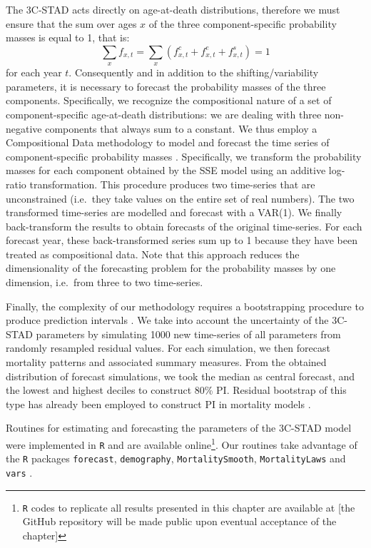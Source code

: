 \documentclass[11pt, a4paper]{article}
\begin{document}
The 3C-STAD acts directly on age-at-death distributions, therefore we must ensure that the sum over ages $x$ of the three component-specific probability masses is equal to 1, that is:
%
\begin{equation}\label{Eq:Masses}
\sum_{x} f_{x,t} = \sum_{x} \left( f^{c}_{x,t}+f^{e}_{x,t}+f^{s}_{x,t}  \right) = 1
\end{equation}
% 
for each year $t$. Consequently and in addition to the shifting/{\color{red}variability} parameters, it is necessary to forecast the probability masses of the three components. Specifically, we recognize the compositional nature of a set of component-specific age-at-death distributions: we are dealing with three non-negative components that always sum to a constant. We thus employ a Compositional Data methodology to model and forecast the time series of component-specific probability masses \citep{aitchison1986statistical, CoDa2011}. Specifically, we transform the probability masses for each component obtained by the SSE model using an additive log-ratio transformation. This procedure produces two time-series that are unconstrained (i.e.~they take values on the entire set of real numbers). The two transformed time-series are modelled and forecast with a VAR(1). We finally back-transform the results to obtain forecasts of the original time-series. For each forecast year, these back-transformed series sum up to 1 because they have been treated as compositional data. Note that this approach reduces the dimensionality of the forecasting problem for the probability masses by one dimension, i.e.~from three to two time-series.

Finally, the complexity of our methodology requires a bootstrapping procedure to produce prediction intervals \citep[PI,][]{efron1994introduction}. We take into account the uncertainty of the 3C-STAD parameters by simulating {\color{red}1000} new time-series of all parameters from randomly resampled residual values. For each simulation, we then forecast mortality patterns and associated summary measures. From the obtained distribution of forecast simulations, we took the median as central forecast, and the lowest and highest deciles to construct 80\% PI. Residual bootstrap of this type has already been employed to construct PI in mortality models \citep{bergeron2017coherent, basellini2019stad}.

Routines for estimating and forecasting the parameters of the 3C-STAD model were implemented in \texttt{R} \citep{Rcite} and are available online\footnote{\texttt{R} codes to replicate all results presented in this chapter are available at [the GitHub repository will be made public upon eventual acceptance of the chapter]}. Our routines take advantage of the \texttt{R} packages \texttt{forecast}, \texttt{demography}, \texttt{MortalitySmooth}, {\color{red}\texttt{MortalityLaws}} and \texttt{vars} \citep{pfaff2008analysis,pfaff2008var,hyndman2008automatic,camarda2012mortalitysmooth,hyndman2018forecastR,demogRpackage,pascariu2018mortalitylaws}.  
\end{document}
